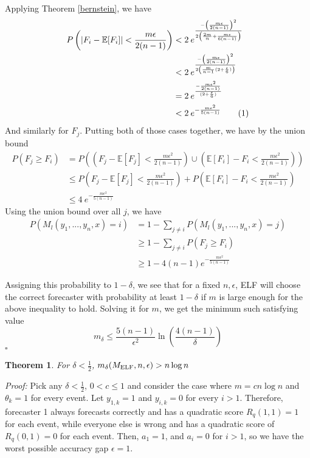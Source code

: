 \documentclass[letterpaper,12pt]{article}
\newcommand{\E}{\mathbb{E}}
\newcommand{\1}{\mathbbm{1}}
\newcommand*{\QED}{\hfill\ensuremath{\square}}%
\newcommand\numberthis{\addtocounter{equation}{1}\tag{\theequation}}
\newtheorem{theorem}{Theorem}
\begin{document}
Applying Theorem \ref{bernstein}, we have
\begin{align*}
    P\left(\left| F_i - \E[F_i]\right| < \frac{m \epsilon}{2(n - 1)} \right) 
    &< 2 \: e^{\frac{-\left(\frac{m \epsilon}{2(n - 1)}\right)^2 }{2\left(\frac{2m}{n} + \frac{m \epsilon}{6(n - 1)}\right)}} \\
    &< 2 \: e^{\frac{-\left(\frac{m \epsilon}{2(n - 1)}\right)^2 }{2\left(\frac{m}{n-1}(2 + \frac{\epsilon}{6}) \right)}} \\
    &= 2 \: e^{\frac{-\frac{m \epsilon^2}{2(n - 1)} }{(2 + \frac{\epsilon}{6})}} \\
    &< 2 \: e^{-\frac{m \epsilon^2}{5(n - 1)} }  \numberthis \label{elf_bernstein} 
\end{align*}
And similarly for $F_j$. Putting both of those cases together, we have by the union bound
\begin{align*}
  P(F_j \geq F_i) &= P\left(\left(F_j - \E[F_j] < \frac{m \epsilon^2}{2(n - 1)}\right) \cup \left(\E[F_i] - F_i < \frac{m \epsilon^2}{2(n - 1)} \right) \right) \\
  &\leq P\left(F_j - \E[F_j] < \frac{m \epsilon^2}{2(n - 1)}\right) + P\left(\E[F_i] - F_i < \frac{m \epsilon^2}{2(n - 1)} \right) \\
  &\leq 4 \: e^{-\frac{m \epsilon^2}{5(n - 1)} }
\end{align*}
Using the union bound over all $j$, we have
\begin{align*}
  P\left(M_l(y_1, ..., y_n, x) = i\right)
  &= 1 - \sum_{j\neq i} P\left(M_l(y_1, ..., y_n, x) = j\right) \\
  &\geq 1 - \sum_{j\neq i} P\left(F_j \geq F_i\right) \\
  &\geq 1 - 4 (n-1) e^{-\frac{m \epsilon^2}{5(n - 1)}} 
\end{align*}

Assigning this probability to $1 - \delta$, we see that for a fixed $n, \epsilon$, ELF will choose the correct forecaster with probability at least $1 - \delta$ if $m$ is large enough for the above inequality to hold. Solving it for $m$, we get the minimum such satisfying value
\[m_\delta \leq \frac{5(n-1)}{\epsilon^2}\ln\left(\frac{4(n-1)}{\delta}\right) \]
\hfill\QED

\begin{theorem}
  \label{elf_lower_bound}
    For $\delta < \frac{1}{2}$, $m_\delta(M_{\mathrm{ELF}}, n, \epsilon) > n \log n$
\end{theorem}
\emph{Proof:} Pick any $\delta < \frac{1}{2}$, $0 < c \leq 1$ and consider the case where $m = c n \log n$ and $\theta_k = 1$ for every event. Let $y_{1, k} = 1$ and $y_{i, k} = 0$ for every $i > 1$. Therefore, forecaster 1 always forecasts correctly and has a quadratic score $R_q(1, 1) = 1$ for each event, while everyone else is wrong and has a quadratic score of $R_q(0, 1) = 0$ for each event. Then, $a_1 = 1$, and $a_i = 0$ for $i > 1$, so we have the worst possible accuracy gap $\epsilon = 1$.
\end{document}
